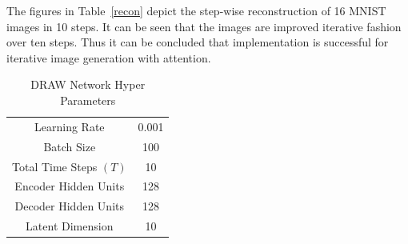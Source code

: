 \documentclass{scrartcl}
\begin{document}
  The figures in Table~\ref{recon} depict the step-wise reconstruction of 16 MNIST images in 10 steps. It can be seen that the images are improved iterative fashion over ten steps. Thus it can be concluded that implementation is successful for iterative image generation with attention.

\begin{table}
\caption{DRAW Network Hyper Parameters}
\centering
\label{hyper}
\begin{tabular}{cc}
\hline
Learning Rate & 0.001 \\
Batch Size & 100 \\
Total Time Steps $(T)$ & 10 \\
Encoder Hidden Units & 128 \\
Decoder Hidden Units & 128 \\
Latent Dimension & 10 \\
\hline
\end{tabular}
\end{table}
\end{document}
